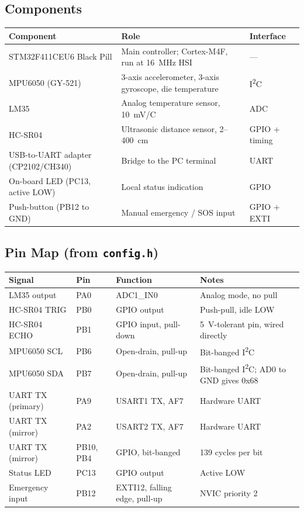 \documentclass[11pt,a4paper]{article}
\newcommand{\degC}{\textdegree{}C}
\begin{document}
\subsection{Components}
\begin{tabularx}{\textwidth}{@{}L{4.2cm} X L{2.2cm}@{}}
\toprule
\textbf{Component} & \textbf{Role} & \textbf{Interface}\\
\midrule
STM32F411CEU6 Black Pill & Main controller; Cortex-M4F, run at 16~MHz HSI & ---\\
MPU6050 (GY-521) & 3-axis accelerometer, 3-axis gyroscope, die temperature & I\textsuperscript{2}C\\
LM35 & Analog temperature sensor, 10~mV/\degC & ADC\\
HC-SR04 & Ultrasonic distance sensor, 2--400~cm & GPIO + timing\\
USB-to-UART adapter (CP2102/CH340) & Bridge to the PC terminal & UART\\
On-board LED (PC13, active LOW) & Local status indication & GPIO\\
Push-button (PB12 to GND) & Manual emergency / SOS input & GPIO + EXTI\\
\bottomrule
\end{tabularx}

\subsection{Pin Map (from \texttt{config.h})}
\begin{tabularx}{\textwidth}{@{}L{3.2cm} L{1.8cm} L{3.8cm} X@{}}
\toprule
\textbf{Signal} & \textbf{Pin} & \textbf{Function} & \textbf{Notes}\\
\midrule
LM35 output & PA0 & ADC1\_IN0 & Analog mode, no pull\\
HC-SR04 TRIG & PB0 & GPIO output & Push-pull, idle LOW\\
HC-SR04 ECHO & PB1 & GPIO input, pull-down & 5~V-tolerant pin, wired directly\\
MPU6050 SCL & PB6 & Open-drain, pull-up & Bit-banged I\textsuperscript{2}C\\
MPU6050 SDA & PB7 & Open-drain, pull-up & Bit-banged I\textsuperscript{2}C; AD0 to GND gives 0x68\\
UART TX (primary) & PA9 & USART1 TX, AF7 & Hardware UART\\
UART TX (mirror) & PA2 & USART2 TX, AF7 & Hardware UART\\
UART TX (mirror) & PB10, PB4 & GPIO, bit-banged & 139 cycles per bit\\
Status LED & PC13 & GPIO output & Active LOW\\
Emergency input & PB12 & EXTI12, falling edge, pull-up & NVIC priority 2\\
\bottomrule
\end{tabularx}
\end{document}
